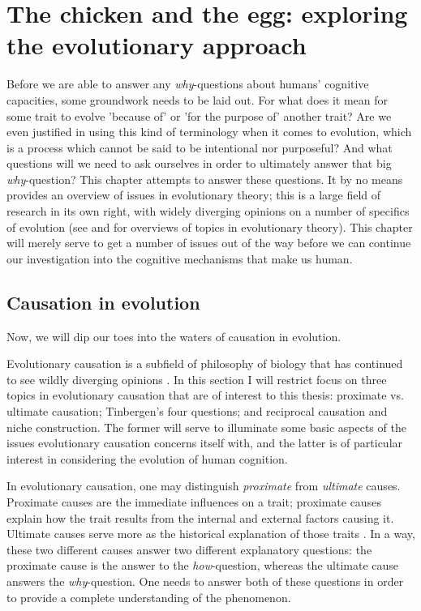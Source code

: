 \chapter{The chicken and the egg: exploring the evolutionary approach}


Before we are able to answer any \emph{why}-questions about humans' cognitive capacities, some groundwork needs to be laid out. For what does it mean for some trait to evolve 'because of' or 'for the purpose of' another trait? Are we even justified in using this kind of terminology when it comes to evolution, which is a process which cannot be said to be intentional nor purposeful? And what questions will we need to ask ourselves in order to ultimately answer that big  \emph{why}-question?
This chapter attempts to answer these questions. It by no means provides an overview of issues in evolutionary theory; this is a large field of research in its own right, with widely diverging opinions on a number of specifics of evolution (see \citet{Ariew02} and \citet{UllerLaland19} for overviews of topics in evolutionary theory).
This chapter will merely serve to get a number of issues out of the way before we can continue our investigation into the cognitive mechanisms that make us human.

\section{Causation in evolution}
\label{sec:causation-evolution}

Now, we will dip our toes into the waters of causation in evolution.

Evolutionary causation is a subfield of philosophy of biology that has continued to see wildly diverging opinions \citep{Baedke2021, UllerLaland19}. In this section I will restrict focus on three topics in evolutionary causation that are of interest to this thesis: proximate vs. ultimate causation; Tinbergen's four questions; and reciprocal causation and niche construction.
The former will serve to illuminate some basic aspects of the issues evolutionary causation concerns itself with, and the latter is of particular interest in considering the evolution of human cognition.

In evolutionary causation, one may distinguish \emph{proximate} from \emph{ultimate} causes.
Proximate causes are the immediate influences on a trait; proximate causes explain how the trait results from the internal and external factors causing it.
Ultimate causes serve more as the historical explanation of those traits \citep{Mayr61}. In a way, these two different causes answer two different explanatory questions: the proximate cause is the answer to the \emph{how}-question, whereas the ultimate cause answers the \emph{why}-question. One needs to answer both of these questions in order to provide a complete understanding of the phenomenon.

